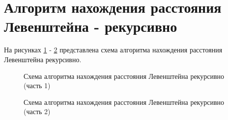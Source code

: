 \section{Алгоритм нахождения расстояния Левенштейна - рекурсивно}
На рисунках \ref{img_rec_1} - \ref{img_rec_2} представлена схема алгоритма нахождения расстояния Левенштейна рекурсивно.
\begin{figure}[p]
	\caption{Схема алгоритма нахождения расстояния Левенштейна рекурсивно (часть 1)}
	\label{img_rec_1}
\end{figure}

\begin{figure}[h]
	\caption{Схема алгоритма нахождения расстояния Левенштейна рекурсивно (часть 2)}
	\label{img_rec_2}
\end{figure}
\newpage

